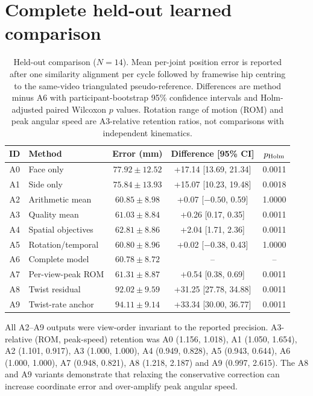 \documentclass[pdflatex,sn-mathphys-num]{sn-jnl}
\begin{document}
\section{Complete held-out learned comparison}

\begin{table}[h]
\caption{Held-out comparison ($N=14$). Mean per-joint position error is
reported after one similarity alignment per cycle followed by framewise hip
centring to the same-video triangulated pseudo-reference. Differences are
method minus A6 with participant-bootstrap 95\% confidence intervals and
Holm-adjusted paired Wilcoxon $p$ values. Rotation range of motion (ROM) and
peak angular speed are A3-relative retention ratios, not comparisons with
independent kinematics.}
\label{tab:complete-heldout}
\centering
\scriptsize
\setlength{\tabcolsep}{3pt}
\begin{tabular}{clccc}
\toprule
ID & Method & Error (mm) & Difference [95\% CI] &
$p_{\rm Holm}$\\
\midrule
A0 & Face only & $77.92\pm12.52$ & +17.14 [13.69, 21.34] & 0.0011\\
A1 & Side only & $75.84\pm13.93$ & +15.07 [10.23, 19.48] & 0.0018\\
A2 & Arithmetic mean & $60.85\pm8.98$ & +0.07 [$-0.50$, 0.59] & 1.0000\\
A3 & Quality mean & $61.03\pm8.84$ & +0.26 [0.17, 0.35] & 0.0011\\
A4 & Spatial objectives & $62.81\pm8.86$ & +2.04 [1.71, 2.36] & 0.0011\\
A5 & Rotation/temporal & $60.80\pm8.96$ & +0.02 [$-0.38$, 0.43] & 1.0000\\
A6 & Complete model & $60.78\pm8.72$ & -- & --\\
A7 & Per-view-peak ROM & $61.31\pm8.87$ & +0.54 [0.38, 0.69] & 0.0011\\
A8 & Twist residual & $92.02\pm9.59$ & +31.25 [27.78, 34.88] & 0.0011\\
A9 & Twist-rate anchor & $94.11\pm9.14$ & +33.34 [30.00, 36.77] & 0.0011\\
\bottomrule
\end{tabular}
\end{table}

All A2--A9 outputs were view-order invariant to the reported precision.
A3-relative (ROM, peak-speed) retention was A0 (1.156, 1.018), A1 (1.050,
1.654), A2 (1.101, 0.917), A3 (1.000, 1.000), A4 (0.949, 0.828), A5
(0.943, 0.644), A6 (1.000, 1.000), A7 (0.948, 0.821), A8 (1.218, 2.187) and
A9 (0.997, 2.615). The A8 and A9 variants demonstrate that relaxing the
conservative correction can increase coordinate error and over-amplify peak
angular speed.
\end{document}
